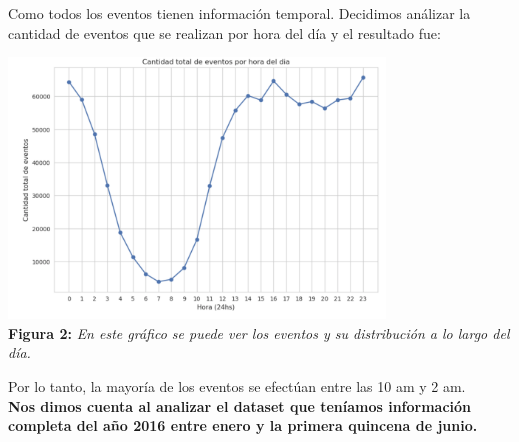 \documentclass[titlepage,a4paper]{article}
\begin{document}
	Como todos los eventos tienen información temporal. Decidimos análizar la cantidad de eventos que se realizan por hora del día y el resultado fue:
	
	\begin{center}
	\includegraphics[width=10cm]{cantidadDeEventosPorHoraDelDia.jpg}\\
	\textbf{Figura 2:}  \textit{En este gráfico se puede ver los eventos y su distribución a lo largo del día. }
	\end{center}
	Por lo tanto, la mayoría de los eventos se efectúan entre las 10 am y 2 am. \\
	
	\textbf{Nos dimos cuenta al analizar el dataset que teníamos información completa del año 2016 entre enero y la primera quincena de junio. }
	
	
\end{document}
